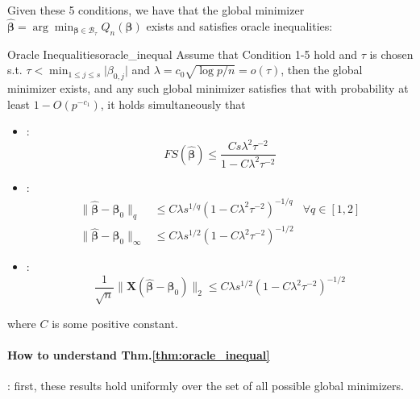 \documentclass[twoside]{article}
\begin{document}
Given these 5 conditions, we have that the global minimizer $\hat{\boldsymbol{\beta}} = \arg \min_{\boldsymbol{\beta}\in \mathcal{B}_{\tau}}Q_n(\boldsymbol{\beta})$ exists and satisfies oracle inequalities:
\begin{theorem}{Oracle Inequalities}{oracle_inequal}
    Assume that Condition 1-5 hold and $\tau$ is chosen s.t. $\tau < \min_{1\leq j \leq s}\lvert \beta_{0,j} \rvert$ and $\lambda = c_0\sqrt{\log p/n} = o(\tau)$, then the global minimizer exists, and any such global minimizer satisfies that with probability at least $1-O(p^{-c_1})$, it holds simultaneously that 
    \begin{itemize}
        \item {}: $$FS(\hat{\boldsymbol{\beta}}) \leq \frac{Cs \lambda^2 \tau^{-2}}{1-C\lambda^2\tau^{-2}}$$
        \item {}: 
        \begin{align*}
            \lVert \hat{\boldsymbol{\beta}} - \boldsymbol{\beta}_0\rVert _q &\leq C\lambda s^{1/q} (1-C\lambda^2\tau^{-2})^{-1/q} &\forall q\in [1,2]\\
            \lVert \hat{\boldsymbol{\beta}} - \boldsymbol{\beta}_0\rVert _{\infty} &\leq C\lambda s^{1/2} (1-C\lambda^2\tau^{-2})^{-1/2}
        \end{align*}
        \item {}: $$\frac{1}{\sqrt{n}} \lVert \mathbf{X}\left(\hat{\boldsymbol{\beta}} - \boldsymbol{\beta}_0\right)\rVert _2 \leq C\lambda s^{1/2} (1-C\lambda^2\tau^{-2})^{-1/2}  $$
    \end{itemize}
    where $C$ is some positive constant.
\end{theorem}
\paragraph*{How to understand Thm.\ref{thm:oracle_inequal}}: first, these results hold uniformly over the set of all possible global minimizers. 

\newpage


\end{document}
